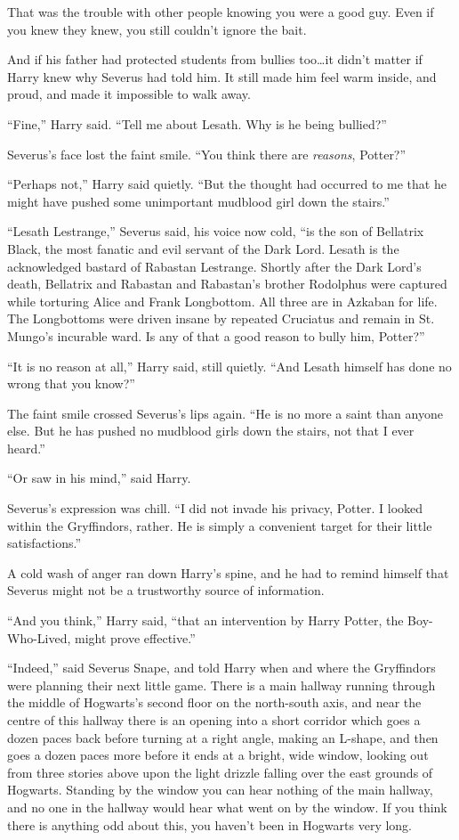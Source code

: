 That was the trouble with other people knowing you were a good guy. Even if you
knew they knew, you still couldn’t ignore the bait.

And if his father had protected students from bullies too…it didn’t
matter if Harry knew why Severus had told him. It still made him feel warm
inside, and proud, and made it impossible to walk away.

“Fine,” Harry said. “Tell me about Lesath. Why is he being bullied?”

Severus’s face lost the faint smile. “You think there are \emph{reasons},
Potter?”

“Perhaps not,” Harry said quietly. “But the thought had occurred to me that he
might have pushed some unimportant mudblood girl down the stairs.”

“Lesath Lestrange,” Severus said, his voice now cold, “is the son of Bellatrix
Black, the most fanatic and evil servant of the Dark Lord. Lesath is the
acknowledged bastard of Rabastan Lestrange. Shortly after the Dark Lord’s
death, Bellatrix and Rabastan and Rabastan’s brother Rodolphus were captured
while torturing Alice and Frank Longbottom. All three are in Azkaban for life.
The Longbottoms were driven insane by repeated Cruciatus and remain in St.
Mungo’s incurable ward. Is any of that a good reason to bully him, Potter?”

“It is no reason at all,” Harry said, still quietly. “And Lesath himself has
done no wrong that you know?”

The faint smile crossed Severus’s lips again. “He is no more a saint than
anyone else. But he has pushed no mudblood girls down the stairs, not that I
ever heard.”

“Or saw in his mind,” said Harry.

Severus’s expression was chill. “I did not invade his privacy, Potter. I looked
within the Gryffindors, rather. He is simply a convenient target for their
little satisfactions.”

A cold wash of anger ran down Harry’s spine, and he had to remind himself that
Severus might not be a trustworthy source of information.

“And you think,” Harry said, “that an intervention by Harry Potter, the
Boy-Who-Lived, might prove effective.”

“Indeed,” said Severus Snape, and told Harry when and where the Gryffindors
were planning their next little game.
\later
There is a main hallway running through the middle of Hogwarts’s second floor
on the north-south axis, and near the centre of this hallway there is an
opening into a short corridor which goes a dozen paces back before turning at a
right angle, making an L-shape, and then goes a dozen paces more before it ends
at a bright, wide window, looking out from three stories above upon the light
drizzle falling over the east grounds of Hogwarts. Standing by the window you
can hear nothing of the main hallway, and no one in the hallway would hear what
went on by the window. If you think there is anything odd about this, you
haven’t been in Hogwarts very long.

